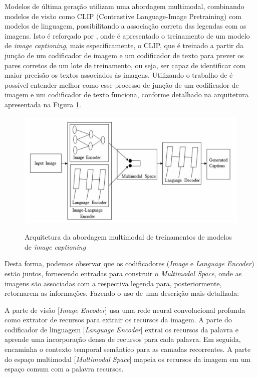 Modelos de última geração utilizam uma abordagem multimodal, combinando modelos de visão como CLIP (Contrastive Language-Image Pretraining) com modelos de linguagem, possibilitando a associação correta das legendas com as imagens. Isto é reforçado por , onde é apresentado o treinamento de um modelo de \textit{image captioning}, mais especificamente, o CLIP, que é treinado a partir da junção de um codificador de imagem e um codificador de texto para prever os pares corretos de um lote de treinamento, ou seja, ser capaz de identificar com maior precisão os textos associados às imagens. Utilizando o trabalho de  é possível entender melhor como esse processo de junção de um codificador de imagem e um codificador de texto funciona, conforme detalhado na arquitetura apresentada na Figura \ref{fig:1}.


\begin{figure}[!h]
     \caption{Arquitetura da abordagem multimodal de treinamentos de modelos de \textit{image captioning}}
     \centering
     \includegraphics[width=0.7\linewidth]{imagens/treinamento-image-captiong.png}
     \label{fig:1}
\end{figure}

Desta forma, podemos observar que os codificadores (\textit{Image} e \textit{Language Encoder}) estão juntos, fornecendo entradas para construir o \textit{Multimodal Space}, onde as imagens são associadas com a respectiva legenda para, posteriormente, retornarem as informações. Fazendo o uso de uma descrição mais detalhada:

\begin{citacao}
    A parte de visão [\textit{Image Encoder}] usa uma rede neural convolucional profunda como extrator de recursos para extrair os recursos da imagem. A parte do codificador de linguagem [\textit{Language Encoder}] extrai os recursos da palavra e aprende uma incorporação densa de recursos para cada palavra. Em seguida, encaminha o contexto temporal semântico para as camadas recorrentes. A parte do espaço multimodal [\textit{Multimodal Space}] mapeia os recursos da imagem em um espaço comum com a palavra recursos. \cite{Hossain2019}    
\end{citacao}

